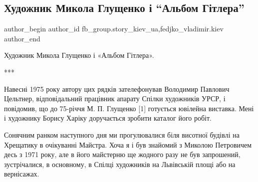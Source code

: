  
 
 
 
 
 
\subsection{Художник Микола Глущенко і \enquote{Альбом Гітлера}}
\label{sec:29_11_2021.fb.fb_group.story_kiev_ua.1.albom_gitlera_hudozhnik_gluschenko}
 
\ifcmt
 author_begin
   author_id fb_group.story_kiev_ua,fedjko_vladimir.kiev
 author_end
\fi

Художник Микола Глущенко і «Альбом Гітлера».

***

Навесні 1975 року автору цих рядків зателефонував Володимир Павлович Цельтнер,
відповідальний працівник апарату Спілки художників УРСР, і повідомив, що до
75-річчя М. П. Глущенко [1] готується ювілейна виставка. Мені і художнику
Борису Харіку доручається зробити каталог його робіт.

Сонячним ранком наступного дня ми прогулювалися біля висотної будівлі на
Хрещатику в очікуванні Майстра. Хоча я і був знайомий з Миколою Петровичем десь
з 1971 року, але в його майстерню ще жодного разу не був запрошений,
зустрічалися, в основному, в Спілці художників на Львівській площі або на
вернісажах.

